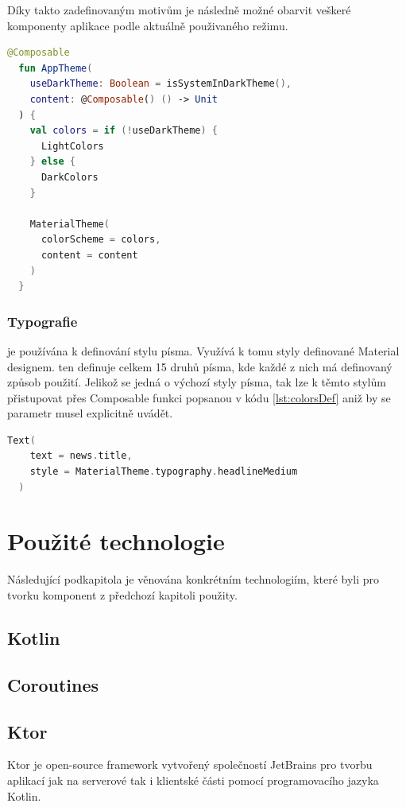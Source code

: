 Díky takto zadefinovaným motivům je následně možné obarvit veškeré komponenty aplikace podle aktuálně použivaného režimu.

\begin{lstlisting}[caption={Definice barevných motivů}, label={lst:colorsDef}, language=Kotlin]
  @Composable
  fun AppTheme(
    useDarkTheme: Boolean = isSystemInDarkTheme(),
    content: @Composable() () -> Unit
  ) {
    val colors = if (!useDarkTheme) {
      LightColors
    } else {
      DarkColors
    }
  
    MaterialTheme(
      colorScheme = colors,
      content = content
    )
  }
\end{lstlisting}

\subsubsection{Typografie}
je používána k definování stylu písma. Využívá k tomu styly definované Material designem. ten definuje celkem 15 druhů písma,
kde každé z nich má definovaný způsob použití. \cite{material3} Jelikož se jedná o výchozí styly písma, tak lze k těmto stylům přistupovat přes
Composable funkci  popsanou v kódu \ref{lst:colorsDef} aniž by se parametr  musel explicitně
uvádět.

\begin{lstlisting}[caption={Ukázka použití stylu písma}, label={lst:typographyExample}, language=Kotlin]
  Text(
    text = news.title,
    style = MaterialTheme.typography.headlineMedium
  )
\end{lstlisting}

\section{Použité technologie}
Následující podkapitola je věnována konkrétním technologiím, které byli pro tvorku komponent z předchozí kapitoli použity.

\subsection{Kotlin}
\subsection{Coroutines}
\subsection{Ktor}
Ktor je open-source framework vytvořený společností JetBrains pro tvorbu aplikací jak na serverové tak i klientské části pomocí programovacího 
jazyka Kotlin.

